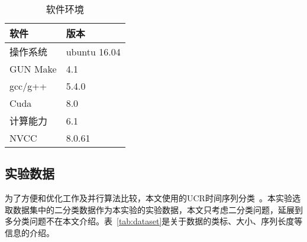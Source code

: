 \begin{table}[htb]
	\centering
	\begin{minipage}{0.5\textwidth}
		\caption{软件环境}
		\label{tab:software}
		\begin{tabular}{p{3cm}p{3cm}}
			\toprule[1.5pt]
			{\heiti 软件} & {\heiti 版本} \\\midrule[1pt]
			操作系统 & ubuntu 16.04 \\
			GUN Make & 4.1 \\
			gcc/g++ & 5.4.0 \\
			Cuda & 8.0 \\
			计算能力 & 6.1 \\
			NVCC & 8.0.61 \\
			\bottomrule[1.5pt]
		\end{tabular}
	\end{minipage}
\end{table}

\subsection{实验数据}
为了方便和优化工作及并行算法比较，本文使用的UCR时间序列分类~\cite{UCRArchive}。本实验选取数据集中的二分类数据作为本实验的实验数据，本文只考虑二分类问题，延展到多分类问题不在本文介绍。表~\ref{tab:dataset}是关于数据的类标、大小、序列长度等信息的介绍。
%

